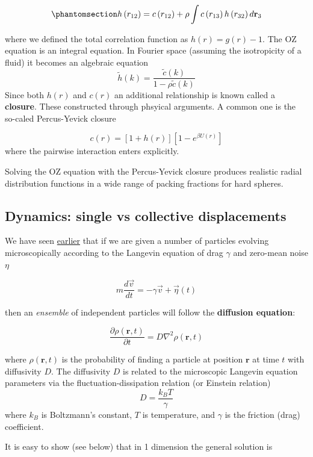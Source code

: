 \documentclass[
  letterpaper,
  enabledeprecatedfontcommands]{report}
\begin{document}
\begin{equation}\phantomsection\label{eq-oz}{
h\left(r_{12}\right)=c\left(r_{12}\right)+\rho \int c\left(r_{13}\right) h\left(r_{32}\right) d \mathbf{r}_3
}\end{equation}

where we defined the total correlation function as \(h(r)=g(r)-1\). The
OZ equation is an integral equation. In Fourier space (assuming the
isotropicity of a fluid) it becomes an algebraic equation \[
\tilde{h}(k)=\frac{\tilde{c}(k)}{1-\rho \tilde{c}(k)}
\] Since both \(h(r)\) and \(c(r)\) an additional relationship is known
called a \textbf{closure}. These constructed through phsyical arguments.
A common one is the so-caled Percus-Yevick closure

\[
c(r)=[1+h(r)]\left[1-e^{\beta U(r)}\right]
\] where the pairwise interaction enters explicitly.

Solving the OZ equation with the Percus-Yevick closure produces
realistic radial distribution functions in a wide range of packing
fractions for hard spheres.

\subsection{Dynamics: single vs collective
displacements}\label{dynamics-single-vs-collective-displacements}

We have seen \hyperref[the-langevin-approach]{earlier} that if we are
given a number of particles evolving microscopically according to the
Langevin equation of drag \(\gamma\) and zero-mean noise \(\eta\)

\[
m \frac{d \vec{v}}{d t}=-\gamma\vec{v}+\vec{\eta}(t)
\]

then an \emph{ensemble} of independent particles will follow the
\textbf{diffusion equation}:

\[\frac{\partial \rho(\mathbf{r}, t)}{\partial t} = D \nabla^2 \rho(\mathbf{r}, t) \]

where \(\rho(\mathbf{r},t)\) is the probability of finding a particle at
position \(\mathbf{r}\) at time \(t\) with diffusivity \(D\). The
diffusivity \(D\) is related to the microscopic Langevin equation
parameters via the fluctuation-dissipation relation (or Einstein
relation) \[
D = \frac{k_B T}{\gamma}
\] where \(k_B\) is Boltzmann's constant, \(T\) is temperature, and
\(\gamma\) is the friction (drag) coefficient.

It is easy to show (see below) that in 1 dimension the general solution
is
\end{document}
